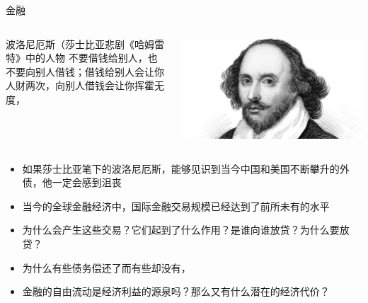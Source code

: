 \documentclass[10pt,hyperref={CJKbookmarks=true},xcolor=dvipsnames,aspectratio=169]{beamer}
\begin{document}
\begin{frame}{金融}
\begin{columns}
	\begin{column}{0.6\textwidth}
		\begin{block}{波洛尼厄斯（莎士比亚悲剧《哈姆雷特》中的人物}
			不要借钱给别人，也不要向别人借钱；借钱给别人会让你人财两次，向别人借钱会让你挥霍无度，
		\end{block}
	\end{column}
	\begin{column}{0.4\textwidth}
		\centering
		\includegraphics[scale=0.5]{fig/bop/shake}
	\end{column}
\end{columns}
\begin{itemize}
	\item 如果莎士比亚笔下的波洛尼厄斯，能够见识到当今中国和美国不断攀升的外债，他一定会感到沮丧
	\item 当今的全球金融经济中，国际金融交易规模已经达到了前所未有的水平
	\item 为什么会产生这些交易？它们起到了什么作用？是谁向谁放贷？为什么要放贷？
	\item 为什么有些债务偿还了而有些却没有，
	\item 金融的自由流动是经济利益的源泉吗？那么又有什么潜在的经济代价？

\end{itemize}	
\end{frame}
\end{document}
